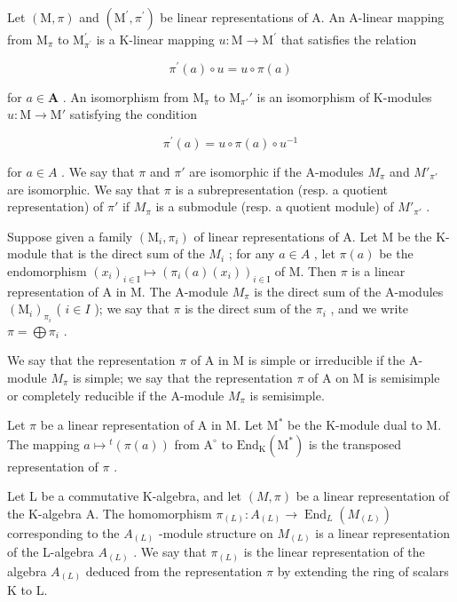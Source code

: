 Let \((\mathrm{M},\pi)\) and \((\mathrm{M}^{\prime},\pi^{\prime})\) be linear representations of A. An A-linear mapping from \(\mathrm{M}_{\pi}\) to \(\mathrm{M}_{\pi^{\prime}}^{\prime}\) is a K-linear mapping \(u:\mathrm{M}\to\mathrm{M}^{\prime}\) that satisfies the relation

\[
\pi^ {\prime} (a) \circ u = u \circ \pi (a)\tag{1}
\]

for \(a \in \mathbf{A}\) . An isomorphism from \(\mathrm{M}_{\pi}\) to \(\mathrm{M}_{\pi'}'\) is an isomorphism of K-modules \(u: \mathrm{M} \to \mathrm{M}'\) satisfying the condition

\[
\pi^ {\prime} (a) = u \circ \pi (a) \circ u ^ {- 1}\tag{2}
\]

for \(a \in A\) . We say that \(\pi\) and \(\pi'\) are isomorphic if the A-modules \(M_{\pi}\) and \(M'_{\pi'}\) are isomorphic. We say that \(\pi\) is a subrepresentation (resp. a quotient representation) of \(\pi'\) if \(M_{\pi}\) is a submodule (resp. a quotient module) of \(M'_{\pi'}\) .

Suppose given a family \((\mathrm{M}_{i},\pi_{i})\) of linear representations of A. Let M be the K-module that is the direct sum of the \(M_{i}\) ; for any \(a\in A\) , let \(\pi(a)\) be the endomorphism \((x_{i})_{i\in\mathrm{I}}\mapsto(\pi_{i}(a)(x_{i}))_{i\in\mathrm{I}}\) of M. Then \(\pi\) is a linear representation of A in M. The A-module \(M_{\pi}\) is the direct sum of the A-modules \((\mathrm{M}_{i})_{\pi_{i}}\) ( \(i\in I\) ); we say that \(\pi\) is the direct sum of the \(\pi_{i}\) , and we write \(\pi=\bigoplus\pi_{i}\) .

We say that the representation \(\pi\) of A in M is simple or irreducible if the A-module \(M_{\pi}\) is simple; we say that the representation \(\pi\) of A on M is semisimple or completely reducible if the A-module \(M_{\pi}\) is semisimple.

Let \(\pi\) be a linear representation of A in M. Let \(\mathrm{M}^*\) be the K-module dual to M. The mapping \(a\mapsto{}^{t}(\pi (a))\) from \(\mathrm{A}^{\circ}\) to \(\mathrm{End}_{\mathrm{K}}(\mathrm{M}^{*})\) is the transposed representation of \(\pi\) .

Let L be a commutative K-algebra, and let \((M,\pi)\) be a linear representation of the K-algebra A. The homomorphism \(\pi_{(L)}:A_{(L)}\to\operatorname{End}_{L}(M_{(L)})\) corresponding to the \(A_{(L)}\) -module structure on \(M_{(L)}\) is a linear representation of the L-algebra \(A_{(L)}\) . We say that \(\pi_{(L)}\) is the linear representation of the algebra \(A_{(L)}\) deduced from the representation \(\pi\) by extending the ring of scalars K to L.

